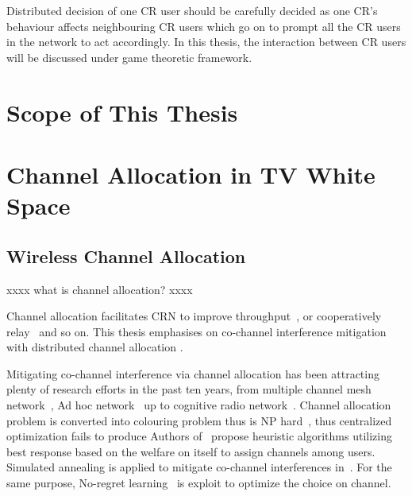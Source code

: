 Distributed decision of one CR user should be carefully decided as one CR's behaviour affects neighbouring CR users which go on to prompt all the CR users in the network to act accordingly.
In this thesis, the interaction between CR users will be discussed under game theoretic framework.



%

\section{Scope of This Thesis}



\section{Channel Allocation in TV White Space}
\subsection{Wireless Channel Allocation}
xxxx what is channel allocation? xxxx

Channel allocation facilitates CRN to improve throughput~\cite{channelAllocation_throughput_12wcnc}, or cooperatively relay~\cite{channelAllocation_relay_2010ICASSP} and so on.
This thesis emphasises on co-channel interference mitigation with distributed channel allocation . 

Mitigating co-channel interference via channel allocation has been attracting plenty of research efforts in the past ten years, from multiple channel mesh network~\cite{Hyacinth}, Ad hoc network~\cite{Babadi08, Ko_DistributedCA} up to cognitive radio network~\cite{SA_CA_TVWS_2012crowncom,qlearning_huang}. 
Channel allocation problem is converted into colouring problem thus is NP hard~\cite{Hyacinth}, thus centralized optimization fails to produce
Authors of~\cite{Babadi08, Ko_DistributedCA} propose heuristic algorithms utilizing best response based on the welfare on itself to assign channels among users.
Simulated annealing is applied to mitigate co-channel interferences in~\cite{SA_CA_TVWS_2012crowncom}.
For the same purpose, No-regret learning~\cite{qlearning_huang, hart00correlatedeq} is exploit to optimize the choice on channel.

